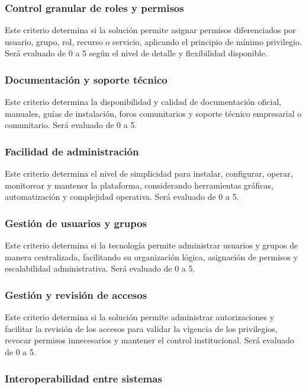 \subsubsection{Control granular de roles y permisos}

Este criterio determina si la solución permite asignar permisos diferenciados por usuario, grupo, rol, recurso o servicio, aplicando el principio de mínimo privilegio. Será evaluado de 0 a 5 según el nivel de detalle y flexibilidad disponible.

\subsubsection{Documentación y soporte técnico}

Este criterio determina la disponibilidad y calidad de documentación oficial, manuales, guías de instalación, foros comunitarios y soporte técnico empresarial o comunitario. Será evaluado de 0 a 5.

\subsubsection{Facilidad de administración}

Este criterio determina el nivel de simplicidad para instalar, configurar, operar, monitorear y mantener la plataforma, considerando herramientas gráficas, automatización y complejidad operativa. Será evaluado de 0 a 5.

\subsubsection{Gestión de usuarios y grupos}

Este criterio determina si la tecnología permite administrar usuarios y grupos de manera centralizada, facilitando su organización lógica, asignación de permisos y escalabilidad administrativa. Será evaluado de 0 a 5.

\subsubsection{Gestión y revisión de accesos}

Este criterio determina si la solución permite administrar autorizaciones y facilitar la revisión de los accesos para validar la vigencia de los privilegios, revocar permisos innecesarios y mantener el control institucional. Será evaluado de 0 a 5.

\subsubsection{Interoperabilidad entre sistemas}

